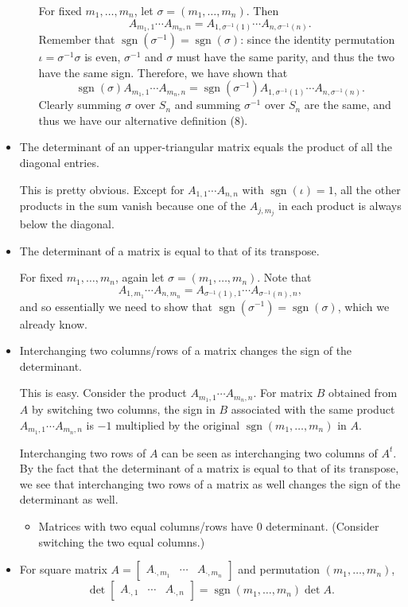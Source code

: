 \documentclass[11pt]{article}
\newcommand{\sgn}{\operatorname{sgn}}
\begin{document}
\begin{itemize}
\begin{itemize}
        For fixed $m_1,\dots,m_n$, let $\sigma = (m_1,\dots,m_n)$. Then \[A_{m_1,1}\cdots A_{m_n,n} = A_{1,\sigma^{-1}(1)}\cdots A_{n,\sigma^{-1}(n)}.\] Remember that $\sgn(\sigma^{-1}) = \sgn(\sigma)$: since the identity permutation $\iota = \sigma^{-1}\sigma$ is even, $\sigma^{-1}$ and $\sigma$ must have the same parity, and thus the two have the same sign. Therefore, we have shown that \[\sgn(\sigma) A_{m_1,1}\cdots A_{m_n,n} = \sgn(\sigma^{-1}) A_{1,\sigma^{-1}(1)}\cdots A_{n,\sigma^{-1}(n)}.\] Clearly summing $\sigma$ over $S_n$ and summing $\sigma^{-1}$ over $S_n$ are the same, and thus we have our alternative definition (8).
    \end{itemize}
    \item The determinant of an upper-triangular matrix equals the product of all the diagonal entries.

    This is pretty obvious. Except for $A_{1,1}\cdots A_{n,n}$ with $\sgn(\iota) = 1$, all the other products in the sum vanish because one of the $A_{j,m_j}$ in each product is always below the diagonal.
    \item The determinant of a matrix is equal to that of its transpose.

    For fixed $m_1,\dots,m_n$, again let $\sigma = (m_1,\dots,m_n)$. Note that \[A_{1,m_1} \cdots A_{n,m_n} = A_{\sigma^{-1}(1),1} \cdots A_{\sigma^{-1}(n),n},\] and so essentially we need to show that $\sgn(\sigma^{-1}) = \sgn(\sigma)$, which we already know.
    \item Interchanging two columns/rows of a matrix changes the sign of the determinant.

    This is easy. Consider the product $A_{m_1,1} \cdots A_{m_n,n}$. For matrix $B$ obtained from $A$ by switching two columns, the sign in $B$ associated with the same product $A_{m_1,1} \cdots A_{m_n,n}$ is $-1$ multiplied by the original $\sgn(m_1,\dots,m_n)$ in $A$.

    Interchanging two rows of $A$ can be seen as interchanging two columns of $A^t$. By the fact that the determinant of a matrix is equal to that of its transpose, we see that interchanging two rows of a matrix as well changes the sign of the determinant as well.
    \begin{itemize}
        \item Matrices with two equal columns/rows have 0 determinant. (Consider switching the two equal columns.)
    \end{itemize}
    \item For square matrix $A = \begin{bmatrix}
        A_{\cdot,m_1} & \cdots & A_{\cdot,m_n}
    \end{bmatrix}$ and permutation $(m_1,\dots,m_n)$, \[\det \begin{bmatrix}
        A_{\cdot,1} & \cdots & A_{\cdot,n}
    \end{bmatrix} = \sgn(m_1,\dots,m_n) \det A.\]


\end{itemize}
\end{document}

